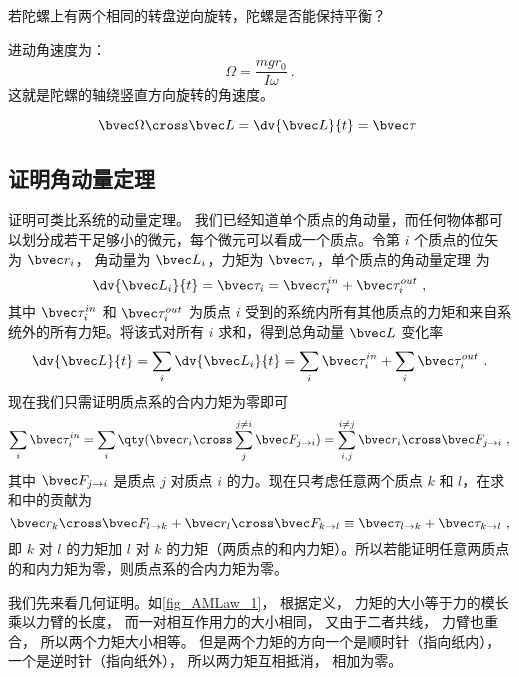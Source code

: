\begin{exercise}{}
若陀螺上有两个相同的转盘逆向旋转，陀螺是否能保持平衡？
\end{exercise}

进动角速度为：
\begin{equation}\label{eq_AMLaw_2}
\Omega = \frac{mgr_0}{I\omega}~.
\end{equation}
这就是陀螺的轴绕竖直方向旋转的角速度。

\begin{equation}
\bvec\Omega\cross\bvec L = \dv{\bvec L}{t} = \bvec\tau~
\end{equation}


\subsection{证明角动量定理}
证明可类比系统的动量定理。 我们已经知道单个质点的角动量，而任何物体都可以划分成若干足够小的微元，每个微元可以看成一个质点。令第 $i$ 个质点的位矢为 $\bvec r_i$， 角动量为 $\bvec L_i$，力矩为 $\bvec \tau_i$，单个质点的角动量定理 为
\begin{equation}
\dv{\bvec L_i}{t} = \bvec \tau_i = \bvec \tau_i^{in} + \bvec \tau_i^{out}~,
\end{equation}
其中 $\bvec \tau_i^{in}$ 和 $\bvec \tau_i^{out}$ 为质点 $i$ 受到的系统内所有其他质点的力矩和来自系统外的所有力矩。将该式对所有 $i$ 求和，得到总角动量 $\bvec L$ 变化率
\begin{equation}
\dv{\bvec L}{t} =\sum_i\dv{\bvec L_i}{t} = \sum_i\bvec \tau_i^{in} + \sum_i\bvec \tau_i^{out}~.
\end{equation}
现在我们只需证明质点系的合内力矩为零即可
\begin{equation}
\sum_i\bvec \tau_i^{in} = \sum_i \qty(\bvec r_i\cross\sum_j^{j\ne i}\bvec F_{j\to i}) = \sum_{i,j}^{i\ne j} \bvec r_i\cross\bvec F_{j\to i}~,
\end{equation}
其中 $\bvec F_{j\to i}$ 是质点 $j$ 对质点 $i$ 的力。现在只考虑任意两个质点 $k$ 和 $l$，在求和中的贡献为
\begin{equation}
\bvec r_k\cross\bvec F_{l\to k} + \bvec r_l\cross\bvec F_{k\to l} \equiv \bvec \tau_{l\to k}+ \bvec \tau_{k\to l}~,
\end{equation}
即 $k$ 对 $l$ 的力矩加 $l$ 对 $k$ 的力矩（两质点的和内力矩）。所以若能证明任意两质点的和内力矩为零，则质点系的合内力矩为零。

我们先来看几何证明。如\autoref{fig_AMLaw_1}， 根据定义， 力矩的大小等于力的模长乘以力臂的长度， 而一对相互作用力的大小相同， 又由于二者共线， 力臂也重合， 所以两个力矩大小相等。 但是两个力矩的方向一个是顺时针（指向纸内）， 一个是逆时针（指向纸外）， 所以两力矩互相抵消， 相加为零。

